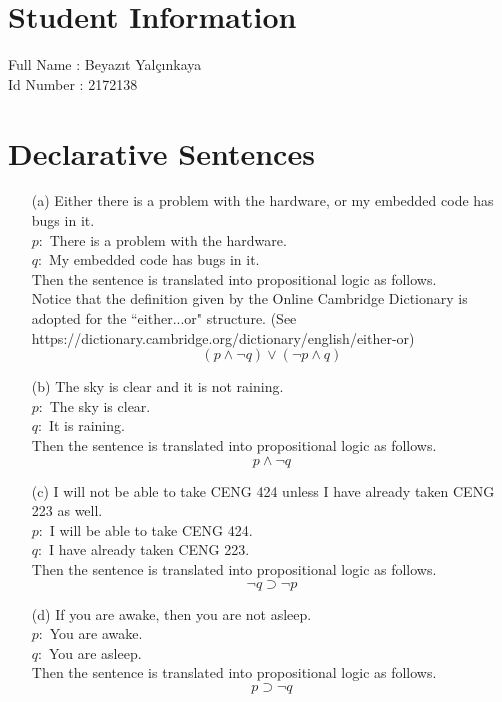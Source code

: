 \documentclass[12pt]{article}
\begin{document}
\section*{Student Information } 

Full Name :  Beyazıt Yalçınkaya\\
Id Number :  2172138\\


\section{Declarative Sentences}

\begin{itemize}
	\item[(a)]
		Either there is a problem with the hardware, or my embedded code has bugs in it. \\
		$p:$ There is a problem with the hardware. \\
                 $q:$ My embedded code has bugs in it. \\
                 Then the sentence is translated into propositional logic as follows. \\
                 Notice that the definition given by the Online Cambridge Dictionary is adopted for the ``either...or" structure. (See https://dictionary.cambridge.org/dictionary/english/either-or)
                 \[
                 	(p \land \neg q) \lor (\neg p \land q)
		\]
                 
	\item[(b)]
		The sky is clear and it is not raining. \\
		$p:$ The sky is clear. \\
		$q:$ It is raining. \\
		Then the sentence is translated into propositional logic as follows. \\
		\[
			p \land \neg q
		\]
		
	\item[(c)]
		I will not be able to take CENG 424 unless I have already taken CENG 223 as well. \\
		$p:$ I will be able to take CENG 424. \\
		$q:$ I have already taken CENG 223. \\
		Then the sentence is translated into propositional logic as follows. \\
		\[
			\neg q \supset \neg p
		\]
		
	\item[(d)]
		If you are awake, then you are not asleep. \\
		$p:$ You are awake. \\
		$q:$ You are asleep. \\
		Then the sentence is translated into propositional logic as follows. \\
		\[
			p \supset \neg q
		\]
		

\end{itemize}
\end{document}
